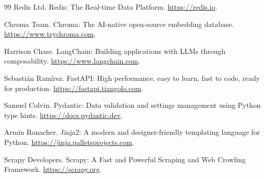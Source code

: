 \documentclass[12pt, a4paper]{article}
\begin{document}
\begin{thebibliography}{99}
{Redis Ltd.}
\newblock Redis: The Real-time Data Platform.
\newblock \url{https://redis.io}.

{Chroma Team}.
\newblock Chroma: The AI-native open-source embedding database.
\newblock \url{https://www.trychroma.com}.


Harrison Chase.
\newblock LangChain: Building applications with LLMs through composability.
\newblock \url{https://www.langchain.com}.

Sebastián Ramírez.
\newblock FastAPI: High performance, easy to learn, fast to code, ready for production.
\newblock \url{https://fastapi.tiangolo.com}.

Samuel Colvin.
\newblock Pydantic: Data validation and settings management using Python type hints.
\newblock \url{https://docs.pydantic.dev}.

Armin Ronacher.
\newblock Jinja2: A modern and designer-friendly templating language for Python.
\newblock \url{https://jinja.palletsprojects.com}.

{Scrapy Developers}.
\newblock Scrapy: A Fast and Powerful Scraping and Web Crowling Framework.
\newblock \url{https://scrapy.org}.

\end{thebibliography}
\end{document}
